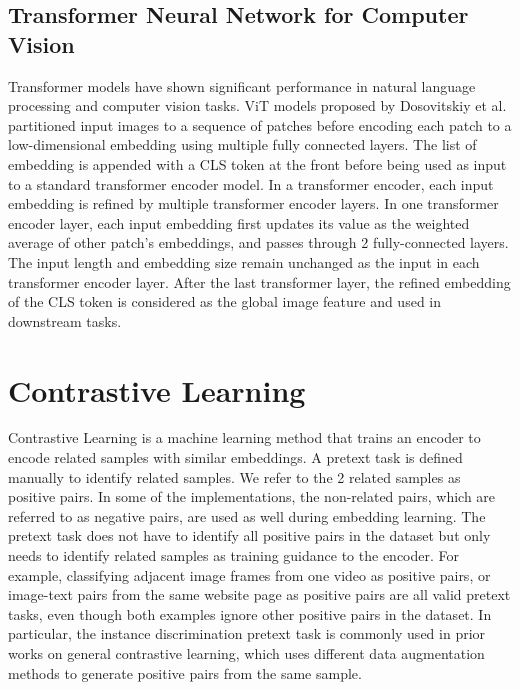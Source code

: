 \documentclass[12pt,twoside]{report}
\begin{document}
\subsection{Transformer Neural Network for Computer Vision}
Transformer models\cite{transformer} have shown significant performance in natural language processing\cite{transformer, gpt3, bert} and computer vision tasks\cite{vit, mae}. ViT models proposed by Dosovitskiy et al.\cite{vit} partitioned input images to a sequence of patches before encoding each patch to a low-dimensional embedding using multiple fully connected layers. The list of embedding is appended with a \<CLS\> token at the front before being used as input to a standard transformer encoder model. In a transformer encoder, each input embedding is refined by multiple transformer encoder layers. In one transformer encoder layer, each input embedding first updates its value as the weighted average of other patch's embeddings, and passes through 2 fully-connected layers. The input length and embedding size remain unchanged as the input in each transformer encoder layer. After the last transformer layer, the refined embedding of the \<CLS\> token is considered as the global image feature and used in downstream tasks. 

\section{Contrastive Learning}
Contrastive Learning is a machine learning method that trains an encoder to encode related samples with similar embeddings. A pretext task is defined manually to identify related samples. We refer to the 2 related samples as positive pairs. In some of the implementations, the non-related pairs, which are referred to as negative pairs, are used as well during embedding learning. The pretext task does not have to identify all positive pairs in the dataset but only needs to identify related samples as training guidance to the encoder. For example, classifying adjacent image frames from one video as positive pairs, or image-text pairs from the same website page as positive pairs are all valid pretext tasks, even though both examples ignore other positive pairs in the dataset. In particular, the instance discrimination pretext task is commonly used in prior works on general contrastive learning, which uses different data augmentation methods to generate positive pairs from the same sample. \\
\end{document}
